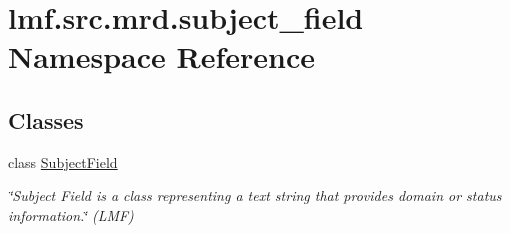\hypertarget{namespacelmf_1_1src_1_1mrd_1_1subject__field}{\section{lmf.\+src.\+mrd.\+subject\+\_\+field Namespace Reference}
\label{namespacelmf_1_1src_1_1mrd_1_1subject__field}
}
\subsection*{Classes}
\begin{DoxyCompactItemize}
\item 
class \hyperlink{classlmf_1_1src_1_1mrd_1_1subject__field_1_1_subject_field}{Subject\+Field}
\begin{DoxyCompactList}\small\item\em \char`\"{}\+Subject Field is a class representing a text string that provides domain or status information.\char`\"{} (L\+M\+F) \end{DoxyCompactList}\end{DoxyCompactItemize}
